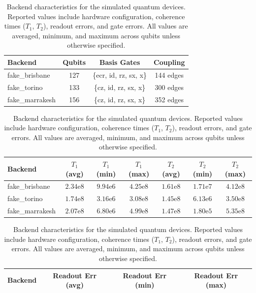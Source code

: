 \documentclass{iopjournal}
\begin{document}
\begin{table}[htbp]

\caption{Backend characteristics for the simulated quantum devices. Reported values include hardware configuration, coherence times ($T_1$, $T_2$), readout errors, and gate errors. All values are averaged, minimum, and maximum across qubits unless otherwise specified.}
\label{tab:backend_specs}

\begin{center}
\small

\begin{tabular}{lccc}
\hline
\textbf{Backend} & \textbf{Qubits} & \textbf{Basis Gates} & \textbf{Coupling} \\
\hline

fake\_brisbane  & 127 & \{ecr, id, rz, sx, x\} & 144 edges \\
fake\_torino    & 133 & \{cz, id, rz, sx, x\}  & 300 edges \\
fake\_marrakesh & 156 & \{cz, id, rz, sx, x\}  & 352 edges \\

\hline
\end{tabular}

\vspace{0.6em}

\begin{tabular}{lcccccc}
\hline
\textbf{Backend} & $T_1$ (avg) & $T_1$ (min) & $T_1$ (max) & $T_2$ (avg) & $T_2$ (min) & $T_2$ (max) \\
\hline

fake\_brisbane  & $2.34\mathrm{e}8$ & $9.94\mathrm{e}6$ & $4.25\mathrm{e}8$ & $1.61\mathrm{e}8$ & $1.71\mathrm{e}7$ & $4.12\mathrm{e}8$ \\
fake\_torino    & $1.74\mathrm{e}8$ & $3.16\mathrm{e}6$ & $3.08\mathrm{e}8$ & $1.45\mathrm{e}8$ & $6.13\mathrm{e}6$ & $3.50\mathrm{e}8$ \\
fake\_marrakesh & $2.07\mathrm{e}8$ & $6.80\mathrm{e}6$ & $4.99\mathrm{e}8$ & $1.47\mathrm{e}8$ & $1.80\mathrm{e}5$ & $5.35\mathrm{e}8$ \\

\hline
\end{tabular}

\vspace{0.6em}

\begin{tabular}{lccc}
\hline
\textbf{Backend} & \textbf{Readout Err (avg)} & \textbf{Readout Err (min)} & \textbf{Readout Err (max)} \\
\hline


\end{tabular}
\end{center}
\end{table}
\end{document}

